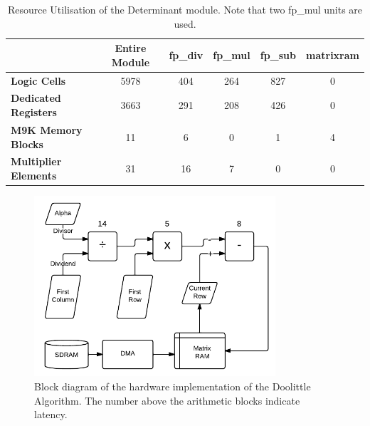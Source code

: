 \documentclass[]{article}
\begin{document}








\begin{table}[htbp]
	\caption{Resource Utilisation of the Determinant module. Note that two fp\_mul units are used.}
	\label{tab:resource_util_det}
	\begin{center}
		\begin{tabular}{l|ccccc}
		\hline

		\hline
											& \textbf{Entire Module} 	& \textbf{fp\_div} 		& \textbf{fp\_mul}	& \textbf{fp\_sub} 	& \textbf{matrixram} \\
		\hline
			\textbf{Logic Cells} 			& 5978						& 404 					& 264 				& 827 				& 0 \\
		\hline
			\textbf{Dedicated Registers}	& 3663						& 291 					& 208 				& 426				& 0 \\
		\hline
			\textbf{M9K Memory Blocks}		& 11						& 6 					& 0 				& 1 				& 4 \\
		\hline
			\textbf{Multiplier Elements}	& 31						& 16 					& 7 				& 0					& 0 \\
		\hline

		\hline
		\end{tabular}
	\end{center}
\end{table}

\begin{figure}[htbp]
	\begin{center}
		\includegraphics[width = 0.8\textwidth]{DeterminantPipeline.pdf}
	\end{center}
	\caption{Block diagram of the hardware implementation of the Doolittle Algorithm. The number above the arithmetic blocks indicate latency.}
	\label{fig:det_block}
\end{figure}
\end{document}
